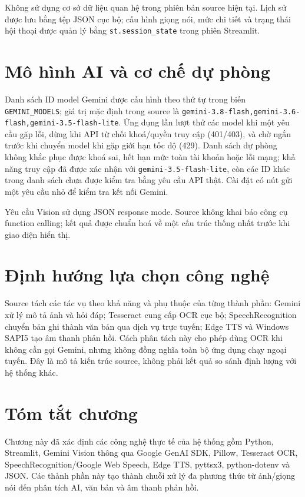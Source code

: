 Không sử dụng cơ sở dữ liệu quan hệ trong phiên bản source hiện tại. Lịch sử
được lưu bằng tệp JSON cục bộ; cấu hình giọng nói, mức chi tiết và trạng thái
hội thoại được quản lý bằng \texttt{st.session\_state} trong phiên Streamlit.

\section{Mô hình AI và cơ chế dự phòng}

Danh sách ID model Gemini được cấu hình theo thứ tự trong biến
\texttt{GEMINI\_MODELS}; giá trị mặc định trong source là
\texttt{gemini-3.8-flash,gemini-3.6-flash,gemini-3.5-flash-lite}. Ứng dụng lần lượt
thử các model khi một yêu cầu gặp lỗi, dừng khi API từ chối khoá/quyền truy cập
(401/403), và chờ ngắn trước khi chuyển model khi gặp giới hạn tốc độ (429).
Danh sách dự phòng không khắc phục được khoá sai, hết hạn mức toàn tài khoản
hoặc lỗi mạng; khả năng truy cập đã được xác nhận với
\texttt{gemini-3.5-flash-lite}, còn các ID khác trong danh sách chưa được kiểm
tra bằng yêu cầu API thật. Cài đặt có nút gửi một yêu cầu nhỏ để kiểm tra
kết nối Gemini.

Yêu cầu Vision sử dụng JSON response mode. Source không khai báo công cụ
function calling; kết quả được chuẩn hoá về một cấu trúc thống nhất trước khi
giao diện hiển thị.

\section{Định hướng lựa chọn công nghệ}

Source tách các tác vụ theo khả năng và phụ thuộc của từng thành phần: Gemini
xử lý mô tả ảnh và hỏi đáp; Tesseract cung cấp OCR cục bộ; SpeechRecognition
chuyển bản ghi thành văn bản qua dịch vụ trực tuyến; Edge TTS và Windows SAPI5
tạo âm thanh phản hồi. Cách phân tách này cho phép dùng OCR khi không cần gọi
Gemini, nhưng không đồng nghĩa toàn bộ ứng dụng chạy ngoại tuyến. Đây là mô tả
kiến trúc source, không phải kết quả so sánh định lượng với hệ thống khác.

\section{Tóm tắt chương}

Chương này đã xác định các công nghệ thực tế của hệ thống gồm Python,
Streamlit, Gemini Vision thông qua Google GenAI SDK, Pillow, Tesseract OCR,
SpeechRecognition/Google Web Speech, Edge TTS, pyttsx3, python-dotenv và JSON.
Các thành phần này tạo thành chuỗi xử lý đa phương thức từ ảnh/giọng nói đến
phân tích AI, văn bản và âm thanh phản hồi.
